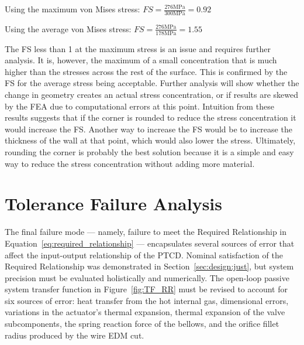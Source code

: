 \documentclass[12pt, letterpaper]{report}%
\newcounter{mycounter}           %
\newcounter{sub}[mycounter]      %
\newcommand{\device}{PTCD}
\begin{document}
	Using the maximum von Mises stress:
	$FS = \frac{276 \text{MPa}}{300 \text{MPa}} = 0.92$

	Using the average von Mises stress:
	$FS = \frac{276 \text{MPa}}{178 \text{MPa}} = 1.55$

	The FS less than 1 at the maximum stress is an issue and requires further analysis. It is, however, the maximum of a small concentration that is much higher than the stresses across the rest of the surface.
	This is confirmed by the FS for the average stress being acceptable. Further analysis will show whether the change in geometry creates an actual stress concentration, or if results are skewed by the FEA due to computational errors at this point.
	Intuition from these results suggests that if the corner is rounded to reduce the stress concentration it would increase the FS. Another way to increase the FS
	would be to increase the thickness of the wall at that point, which would also lower the stress. Ultimately, rounding the corner is probably the best solution because it is a simple and 
	easy way to reduce the stress concentration without adding more material. 

	\section{Tolerance Failure Analysis}
	\label{subsec:DFMEA::tol}

		The final failure mode --- namely, failure to meet the Required Relationship in Equation~\eqref{eq:required_relationship} --- encapsulates several sources of error that affect the input-output relationship of the \device.
		Nominal satisfaction of the Required Relationship was demonstrated in Section~\ref{sec:design:just}, but system precision must be evaluated holistically and numerically.
		The open-loop passive system transfer function in Figure~\ref{fig:TF_RR} must be revised to account for six sources of error:
		heat transfer from the hot internal gas, dimensional errors, variations in the actuator's thermal expansion, thermal expansion of the valve subcomponents, the spring reaction force of the bellows, and the orifice fillet radius produced by the wire EDM cut.
\end{document}
